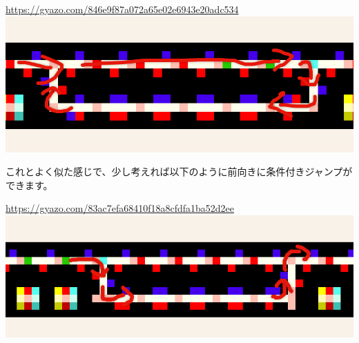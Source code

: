 \url{https://gyazo.com/846e9f87a072a65e02e6943e20adc534}\\
\href{https://gyazo.com/846e9f87a072a65e02e6943e20adc534}{\includegraphics[width=\textwidth]{images/846e9f87a072a65e02e6943e20adc534.png}}

これとよく似た感じで、少し考えれば以下のように前向きに条件付きジャンプができます。

\url{https://gyazo.com/83ac7efa68410f18a8cfdfa1ba52d2ee}\\
\href{https://gyazo.com/83ac7efa68410f18a8cfdfa1ba52d2ee}{\includegraphics[width=\textwidth]{images/83ac7efa68410f18a8cfdfa1ba52d2ee.png}}
